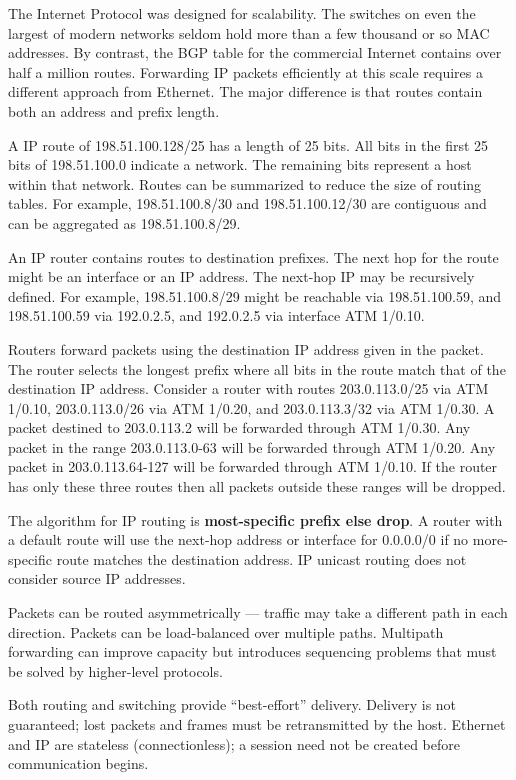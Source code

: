 \documentclass{book}
\begin{document}
The Internet Protocol was designed for scalability. The switches on even the largest of modern networks seldom hold more than a few thousand or so MAC addresses. By contrast, the BGP table for the commercial Internet contains over half a million routes. Forwarding IP packets efficiently at this scale requires a different approach from Ethernet. The major difference is that routes contain both an address and prefix length.

A IP route of 198.51.100.128/25 has a length of 25 bits. All bits in the first 25 bits of 198.51.100.0 indicate a network. The remaining bits represent a host within that network. Routes can be summarized to reduce the size of routing tables. For example, 198.51.100.8/30 and 198.51.100.12/30 are contiguous and can be aggregated as 198.51.100.8/29.

An IP router contains routes to destination prefixes. The next hop for the route might be an interface or an IP address. The next-hop IP may be recursively defined. For example, 198.51.100.8/29 might be reachable via 198.51.100.59, and 198.51.100.59 via 192.0.2.5, and 192.0.2.5 via interface ATM 1/0.10.

Routers forward packets using the destination IP address given in the packet. The router selects the longest prefix where all bits in the route match that of the destination IP address. Consider a router with routes 203.0.113.0/25 via ATM 1/0.10, 203.0.113.0/26 via ATM 1/0.20, and 203.0.113.3/32 via ATM 1/0.30. A packet destined to 203.0.113.2 will be forwarded through ATM 1/0.30. Any packet in the range 203.0.113.0-63 will be forwarded through ATM 1/0.20. Any packet in 203.0.113.64-127 will be forwarded through ATM 1/0.10. If the router has only these three routes then all packets outside these ranges will be dropped.

The algorithm for IP routing is \textbf{most-specific prefix else drop}. A router with a default route will use the next-hop address or interface for 0.0.0.0/0 if no more-specific route matches the destination address. IP unicast routing does not consider source IP addresses.

Packets can be routed asymmetrically --- traffic may take a different path in each direction. Packets can be load-balanced over multiple paths. Multipath forwarding can improve capacity but introduces sequencing problems that must be solved by higher-level protocols.

Both routing and switching provide ``best-effort'' delivery. Delivery is not guaranteed; lost packets and frames must be retransmitted by the host. Ethernet and IP are stateless (connectionless); a session need not be created before communication begins.
\end{document}
